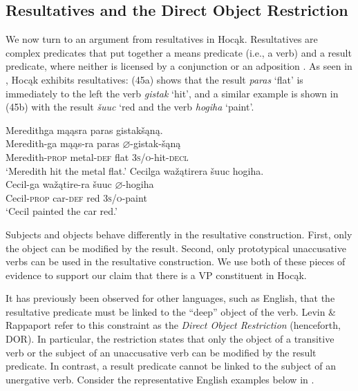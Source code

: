 \documentclass[output=paper]{LSP/langsci}
\begin{document}
\subsection{Resultatives and the Direct Object Restriction}

We now turn to an argument from resultatives in Hocąk. Resultatives are complex predicates that put together a means predicate (i.e., a verb) and a result predicate, where neither is licensed by a conjunction or an adposition \citep[507]{Williams2008}. As seen in , Hocąk exhibits resultatives: (45a) shows that the result \textit{paras} `flat' is immediately to the left the verb \textit{gistak} `hit', and a similar example is shown in (45b) with the result \textit{\v{s}uuc} `red and the verb \textit{hogiha} `paint'.

\begin{exe}
\ex
\begin{xlist}
\ex 
\glll Meredithga	mąąsra		paras	gistak\v{s}ąną.\\
Meredith-ga			mąąs-ra	paras	$\varnothing$-gistak-\v{s}ąną \\
	Meredith-\textsc{prop}		metal-\textsc{def}		flat	 \textsc{3s/o}-hit-\textsc{decl} \\
\trans `Meredith hit the metal flat.'
\ex 
\glll Cecilga	wa\v{z}ątirera	 \v{s}uuc	hogiha.\\
Cecil-ga	wa\v{z}ątire-ra \v{s}uuc	$\varnothing$-hogiha \\
	Cecil-\textsc{prop}	car-\textsc{def}	red		\textsc{3s/o}-paint \\
\trans `Cecil painted the car red.'
\end{xlist}
\end{exe}

Subjects and objects behave differently in the resultative construction. First, only the object can be modified by the result. Second, only prototypical unaccusative verbs can be used in the resultative construction. We use both of these pieces of evidence to support our claim that there is a VP constituent in Hocąk.

It has previously been observed for other languages, such as English, that the resultative predicate must be linked to the ``deep'' object of the verb. Levin \& Rappaport \citet{Hovav1995} refer to this constraint as the \textit{Direct Object Restriction} (henceforth, DOR). In particular, the restriction states that only the object of a transitive verb or the subject of an unaccusative verb can be modified by the result predicate. In contrast, a result predicate cannot be linked to the subject of an unergative verb. Consider the representative English examples below in .
\end{document}
